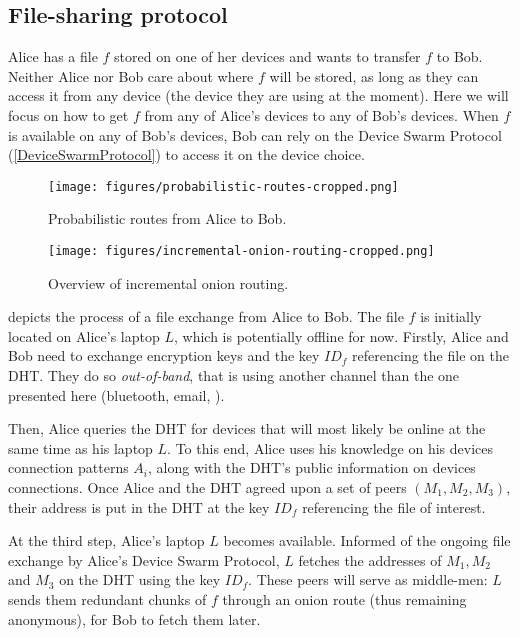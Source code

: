 \subsection{File-sharing protocol}%
\label{FileSharingProtocol}

Alice has a file \(f\) stored on one of her devices and wants to transfer \(f\) 
to Bob.
Neither Alice nor Bob care about where \(f\) will be stored, as long as they can 
access it from any device (\ie the device they are using at the moment).
Here we will focus on how to get \(f\) from any of Alice's devices to any of 
Bob's devices.
When \(f\) is available on any of Bob's devices, Bob can rely on the Device 
Swarm Protocol (\cref{DeviceSwarmProtocol}) to access it on the device choice.

\begin{figure*}
  \centering
  \texttt{[image: figures/probabilistic-routes-cropped.png]}
  \caption{\label{ProbabilisticRoutes}%
    Probabilistic routes from Alice to Bob.
  }
\end{figure*}

\begin{figure*}
  \centering
  \texttt{[image: figures/incremental-onion-routing-cropped.png]}
  \caption{\label{IncrementalOnionRouting}%
    Overview of incremental onion routing.
  }
\end{figure*}

 depicts the process of a file exchange from Alice to Bob.
The file $f$ is initially located on Alice's laptop $L$, which is potentially offline for now.
Firstly, Alice and Bob need to exchange encryption keys and the key $ID_f$ 
referencing the file on the \ac{DHT}.
They do so \emph{out-of-band}, that is using another channel than the one 
presented here (\eg bluetooth, email, \etc).

Then, Alice queries the DHT for devices that will most likely be online at the same time as his laptop $L$.
To this end, Alice uses his knowledge on his devices connection patterns $A_i$, along with the DHT's public information on devices connections.
Once Alice and the DHT agreed upon a set of peers $(M_1, M_2, M_3)$, their address is put in the DHT at the key $ID_f$ referencing the file of interest.

At the third step, Alice's laptop $L$ becomes available. 
Informed of the ongoing file exchange by Alice's Device Swarm Protocol, $L$ fetches the addresses of $M_1, M_2$ and $M_3$ on the DHT using the key $ID_f$.
These peers will serve as middle-men: $L$ sends them redundant chunks of $f$ through an onion route (thus remaining anonymous), for Bob to fetch them later.

